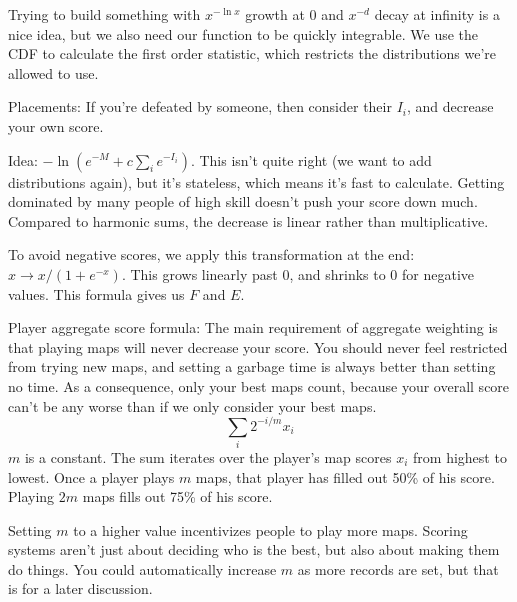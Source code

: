 Trying to build something with $x^{-\ln x}$ growth at 0 and $x^{-d}$ decay at infinity is a nice idea, but we also need our function to be quickly integrable. We use the CDF to calculate the first order statistic, which restricts the distributions we're allowed to use.

\pagebreak
Placements: If you're defeated by someone, then consider their $I_i$, and decrease your own score.

Idea: $-\ln (e^{-M} + c\sum_i e^{-I_i})$. This isn't quite right (we want to add distributions again), but it's stateless, which means it's fast to calculate. Getting dominated by many people of high skill doesn't push your score down much. Compared to harmonic sums, the decrease is linear rather than multiplicative.

To avoid negative scores, we apply this transformation at the end: $x \to x / (1 + e^{-x})$. This grows linearly past 0, and shrinks to 0 for negative values. This formula gives us $F$ and $E$.

\pagebreak
Player aggregate score formula: The main requirement of aggregate weighting is that playing maps will never decrease your score. You should never feel restricted from trying new maps, and setting a garbage time is always better than setting no time. As a consequence, only your best maps count, because your overall score can't be any worse than if we only consider your best maps.
\begin{equation}\sum_{i} 2^{-i/m} x_i\end{equation}
$m$ is a constant. The sum iterates over the player's map scores $x_i$ from highest to lowest. Once a player plays $m$ maps, that player has filled out 50\% of his score. Playing $2m$ maps fills out 75\% of his score.

Setting $m$ to a higher value incentivizes people to play more maps. Scoring systems aren't just about deciding who is the best, but also about making them do things. You could automatically increase $m$ as more records are set, but that is for a later discussion.
